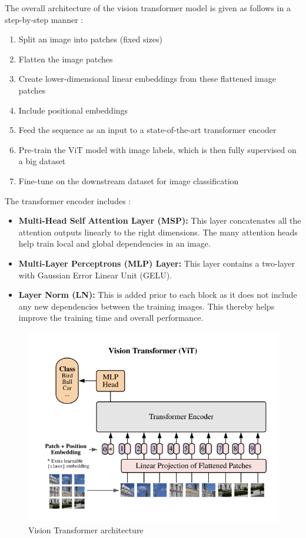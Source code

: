 The overall architecture of the vision transformer model is given as follows in a step-by-step manner \cite{w10}:
\begin{enumerate}
    \item Split an image into patches (fixed sizes)
    \item Flatten the image patches
    \item Create lower-dimensional linear embeddings from these flattened image patches
    \item Include positional embeddings
    \item Feed the sequence as an input to a state-of-the-art transformer encoder
    \item Pre-train the ViT model with image labels, which is then fully supervised on a big dataset
    \item Fine-tune on the downstream dataset for image classification
\end{enumerate}
The transformer encoder includes  \cite{w10}:
\begin{itemize}
    \item \textbf{Multi-Head Self Attention Layer (MSP):} This layer concatenates all the attention outputs linearly to the right dimensions. The many attention heads help train local and global dependencies in an image.

    \item \textbf{ Multi-Layer Perceptrons (MLP) Layer:} This layer contains a two-layer with Gaussian Error Linear Unit (GELU).
    \item \textbf{Layer Norm (LN):} This is added prior to each block as it does not include any new dependencies between the training images. This thereby helps improve the training time and overall performance.
\end{itemize}

\begin{figure}[H]
    \centering
    \includegraphics[width=1\textwidth]{chapters/chapter02/fig02/vit.png}
    \caption{ Vision Transformer architecture}
\end{figure}

